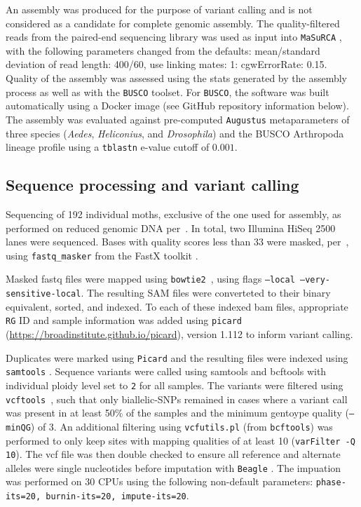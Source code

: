 \documentclass[fleqn,11pt]{wlpeerj}
\begin{document}
An assembly was produced for the purpose of variant calling and is not
considered as a candidate for complete genomic assembly. The quality-filtered
reads from the paired-end sequencing library was used as input into
\texttt{MaSuRCA} \citep[][version 2.3.2]{Zimin:2013kn}, with the following
parameters changed from the defaults: mean/standard deviation of read length:
400/60, use linking mates: 1: cgwErrorRate: 0.15.  Quality of the assembly was
assessed using the stats generated by the assembly process as well as with the
\texttt{BUSCO} \citep[][version 1.1b1]{Simao:2015kk} toolset. For
\texttt{BUSCO}, the software was built automatically using a Docker image (see
GitHub repository information below). The assembly was evaluated against
pre-computed \texttt{Augustus} \citep{Stanke:2003eo} metaparameters of  three
species (\textit{Aedes}, \textit{Heliconius}, and \textit{Drosophila}) and the
BUSCO Arthropoda lineage profile using a \texttt{tblastn} e-value cutoff of
$0.001$.

\subsection*{Sequence processing and variant calling} Sequencing of 192
individual moths, exclusive of the one used for assembly,  as performed on
reduced genomic DNA per~\cite{PARCHMAN:2012ca}. In total, two  Illumina HiSeq
2500 lanes were sequenced. Bases with quality scores less than 33 were masked,
per~\cite{Yun:2014dn},  using \texttt{fastq\_masker} from the FastX toolkit
\citep[][version 0.0.14]{citeulike:9103573}.

Masked fastq files were mapped using \texttt{bowtie2}~\citep[][version
2.2.4]{Langmead:2012jh}, using flags  \texttt{--local
--very-sensitive-local}.  The resulting  SAM files were converteted to their
binary equivalent, sorted, and indexed. To each of these indexed bam files,
appropriate \texttt{RG} ID and sample information was added using
\texttt{picard} \\ (\url{https://broadinstitute.github.io/picard}), version 1.112
to inform variant calling.

Duplicates were marked using \texttt{Picard} and the resulting files were
indexed using \texttt{samtools} \citep[][version 1.2]{Li:2009ka}.  Sequence
variants were called using samtools and bcftools \citep[][version
1.2]{Li:2009ka} with individual  ploidy level set to \texttt{2} for all samples.
The variants were filtered  using \texttt{vcftools}~\citep[][version
0.1.14]{Danecek:2011gz}, such that only biallelic-SNPs remained in cases where a
variant call was present in at least 50\% of the samples and the minimum
gentoype quality (\texttt{--minQG}) of 3. An additional filtering using
\texttt{vcfutils.pl} (from \texttt{bcftools}) was performed to only keep sites
with mapping qualities of at least 10 (\texttt{varFilter -Q 10}). The vcf file
was then double checked to ensure all reference and alternate alleles were
single nucleotides before imputation with \texttt{Beagle}
\citep[][version 4.0, r1399]{Browning:2007ge}.  The impuation was performed on 30 CPUs
using the following non-default parameters: \texttt{phase-its=20, burnin-its=20,
impute-its=20}.
\end{document}
